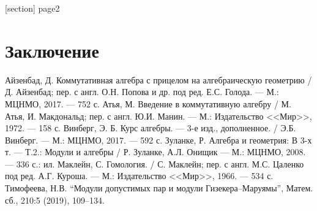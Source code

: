 \documentclass[a4paper,12pt]{article}
\newcommand{\anonsection}[1]{\section*{#1}\addcontentsline{toc}{section}{#1}}
\begin{document}
    \newtheorem{Ex}{Упражнение}[section]
    \newtheorem{Statement}{Утверждение}[section]
    \newtheorem{Theorem}{Теорема}[section]
    \newtheorem{Lemma}{Лемма}[section]
    \newtheorem{Corollary}[Theorem]{Следствие}
    \newtheorem{Proposal}{Предложение}[section]
    \newenvironment{Proof}{\par{\bf \noindent Доказательство.}}{{\hfill$\scriptstyle\blacksquare$\newline}}

    [section]
    \newenvironment{Def}
    {   
        \refstepcounter{defcnt}
        \par{\bf \noindent Определение \thesection .\thedefcnt}
    }
    
    

    \setcounter{page}{2}

    

    \newpage

    \tableofcontents


    

    

    \newpage
    \anonsection{Заключение}
    

    \newpage
    \begin{thebibliography}{00}
        Айзенбад, Д. Коммутативная алгебра с прицелом на алгебраическую геометрию / Д. Айзенбад; пер. с англ. О.Н. Попова и др. под ред. Е.С. Голода. --- М.: МЦНМО, 2017. --- 752 с.
        Атья, М. Введение в коммутативную алгебру / М. Атья, И. Макдональд; пер. с англ. Ю.И. Манин. --- М.: Издательство <<Мир>>, 1972. --- 158 с.
        Винберг, Э. Б. Курс алгебры. --- 3-е изд., дополненное. / Э.Б. Винберг. --- М.: МЦНМО, 2017. --- 592 с.
        Зуланке, Р. Алгебра и геометрия: В 3-х т. --- Т.2.: Модули и алгебры / Р. Зуланке, А.Л. Онищик --- М.: МЦНМО, 2008. --- 336 с.: ил.
        Маклейн, С. Гомология. / С. Маклейн; пер. с англ. М.С. Цаленко под ред. А.Г. Куроша. --- М.: Издательство <<Мир>>, 1966. --- 534 с.
        Тимофеева, Н.В.  “Модули допустимых пар и модули Гизекера–Маруямы”, Матем. сб., 210:5 (2019),  109–134.
    \end{thebibliography}
\end{document}
